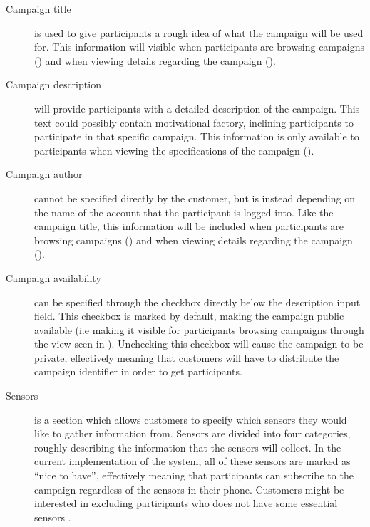 \begin{description}
    \item[Campaign title] is used to give participants a rough idea of what the campaign will be used for. This information will visible when participants are browsing campaigns () and when viewing details regarding the campaign ().

    \item[Campaign description] will provide participants with a detailed description of the campaign. This text could possibly contain motivational factory, inclining participants to participate in that specific campaign. This information is only available to participants when viewing the specifications of the campaign ().

    \item[Campaign author] cannot be specified directly by the customer, but is instead depending on the name of the account that the participant is logged into. Like the campaign title, this information will be included when participants are browsing campaigns () and when viewing details regarding the campaign ().

    \item[Campaign availability] can be specified through the checkbox directly below the description input field. This checkbox is marked by default, making the campaign public available (i.e making it visible for participants browsing campaigns through the view seen in ). Unchecking this checkbox will cause the campaign to be private, effectively meaning that customers will have to distribute the campaign identifier in order to get participants.

    \item[Sensors] is a section which allows customers to specify which sensors they would like to gather information from. Sensors are divided into four categories, roughly describing the information that the sensors will collect. In the current implementation of the system, all of these sensors are marked as ``nice to have'', effectively meaning that participants can subscribe to the campaign regardless of the sensors in their phone. Customers might be interested in excluding participants who does not have some essential sensors . 


\end{description}
